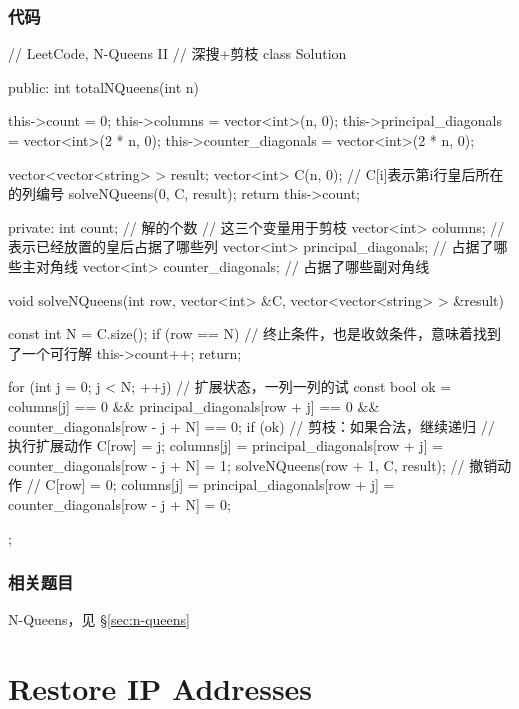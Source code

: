 \subsubsection{代码}
\begin{Code}
// LeetCode, N-Queens II
// 深搜+剪枝
class Solution {
public:
    int totalNQueens(int n) {
        this->count = 0;
        this->columns = vector<int>(n, 0);
        this->principal_diagonals = vector<int>(2 * n, 0);
        this->counter_diagonals = vector<int>(2 * n, 0);

        vector<vector<string> > result;
        vector<int> C(n, 0);  // C[i]表示第i行皇后所在的列编号
        solveNQueens(0, C, result);
        return this->count;
    }
private:
    int count; // 解的个数
    // 这三个变量用于剪枝
    vector<int> columns;  // 表示已经放置的皇后占据了哪些列
    vector<int> principal_diagonals;  // 占据了哪些主对角线
    vector<int> counter_diagonals;  // 占据了哪些副对角线

    void solveNQueens(int row, vector<int> &C,
            vector<vector<string> > &result) {
        const int N = C.size();
        if (row == N) { // 终止条件，也是收敛条件，意味着找到了一个可行解
            this->count++;
            return;
        }

        for (int j = 0; j < N; ++j) {  // 扩展状态，一列一列的试
            const bool ok = columns[j] == 0 &&
                    principal_diagonals[row + j] == 0
                    && counter_diagonals[row - j + N] == 0;
            if (ok) {  // 剪枝：如果合法，继续递归
                // 执行扩展动作
                C[row] = j;
                columns[j] = principal_diagonals[row + j] =
                        counter_diagonals[row - j + N] = 1;
                solveNQueens(row + 1, C, result);
                // 撤销动作
                // C[row] = 0;
                columns[j] = principal_diagonals[row + j] =
                        counter_diagonals[row - j + N] = 0;
            }
        }
    }
};
\end{Code}


\subsubsection{相关题目}
\begindot
\item N-Queens，见 \S \ref{sec:n-queens}
\myenddot


\section{Restore IP Addresses} %
\label{sec:restore-ip-addresses}



